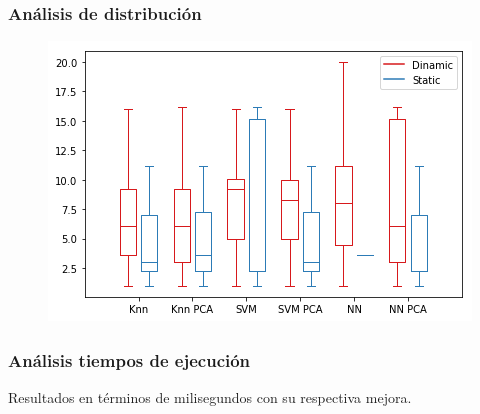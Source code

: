 \documentclass[mathserif]{beamer}
\begin{document}
\begin{frame}
\frametitle{Análisis de distribución}

\begin{figure}
\includegraphics[width=\textwidth]{../figures/boxplot.png}
\end{figure}

\end{frame}

\begin{frame}
\frametitle{Análisis tiempos de ejecución}

Resultados en términos de milisegundos con su respectiva mejora.

\begin{table}[ht!]
\centering
{}
\end{table}

\end{frame}
\end{document}
